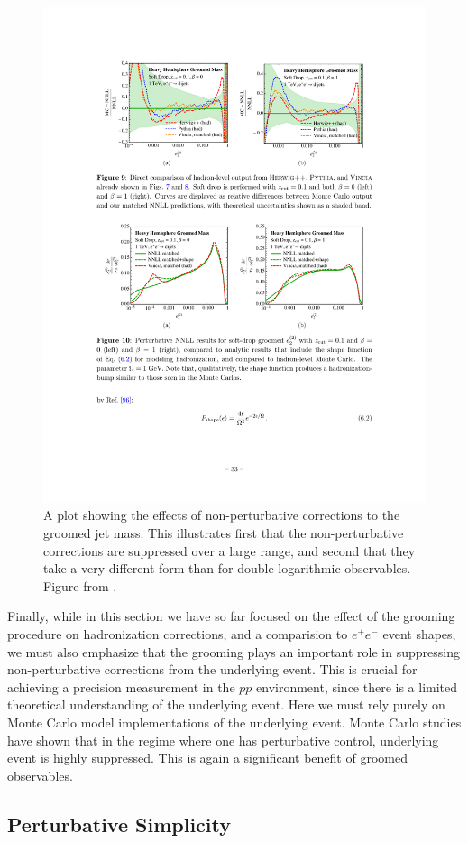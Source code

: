 \begin{figure}
\begin{center}
\includegraphics[width = 0.6\columnwidth]{figures/shape_function.pdf}
\end{center}
\caption{A plot showing the effects of non-perturbative corrections to the groomed jet mass. This illustrates first that the non-perturbative corrections are suppressed over a large range, and second that they take a very different form than for double logarithmic observables. Figure from \cite{Frye:2016aiz}. }
\label{fig:shape_function}
\end{figure}




Finally, while in this section we have so far focused on the effect of the grooming procedure on hadronization corrections, and a comparision to $e^+e^-$ event shapes, we must also emphasize that the grooming plays an important role in suppressing non-perturbative corrections from the underlying event. This is crucial for achieving a precision measurement in the $pp$ environment, since there is a limited theoretical understanding of the underlying event. Here we must rely purely on Monte Carlo model implementations of the underlying event.  Monte Carlo studies have shown that in the regime where one has perturbative control, underlying event is highly suppressed. This is again a significant benefit of groomed observables. 




\subsection{Perturbative Simplicity}
\label{sec:pertsimplicity}

